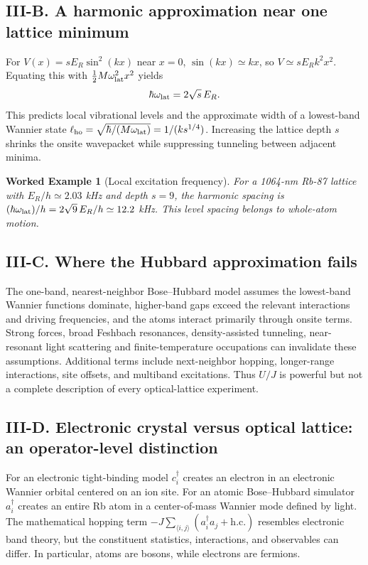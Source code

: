 \documentclass[11pt,a4paper]{article}
\newtheorem{example}{Worked Example}
\begin{document}
\subsection*{III-B. A harmonic approximation near one lattice minimum}
For $V(x)=sE_R\sin^2(kx)$ near $x=0$, $\sin(kx)\simeq kx$, so $V\simeq sE_R k^2x^2$. Equating this with $\tfrac12M\omega_{\rm lat}^2x^2$ yields
\begin{equation}\hbar\omega_{\rm lat}=2\sqrt{s}\,E_R.\end{equation}
This predicts local vibrational levels and the approximate width of a lowest-band Wannier state $\ell_{\rm ho}=\sqrt{\hbar/(M\omega_{\rm lat})}=1/(k s^{1/4})$. Increasing the lattice depth $s$ shrinks the onsite wavepacket while suppressing tunneling between adjacent minima.
\begin{example}[Local excitation frequency]
For a 1064-nm Rb-87 lattice with $E_R/h\simeq2.03$ kHz and depth $s=9$, the harmonic spacing is $(\hbar\omega_{\rm lat})/h=2\sqrt9\,E_R/h\simeq12.2$ kHz. This level spacing belongs to whole-atom motion.
\end{example}
\subsection*{III-C. Where the Hubbard approximation fails}
The one-band, nearest-neighbor Bose--Hubbard model assumes the lowest-band Wannier functions dominate, higher-band gaps exceed the relevant interactions and driving frequencies, and the atoms interact primarily through onsite terms. Strong forces, broad Feshbach resonances, density-assisted tunneling, near-resonant light scattering and finite-temperature occupations can invalidate these assumptions. Additional terms include next-neighbor hopping, longer-range interactions, site offsets, and multiband excitations. Thus $U/J$ is powerful but not a complete description of every optical-lattice experiment.
\subsection*{III-D. Electronic crystal versus optical lattice: an operator-level distinction}
For an electronic tight-binding model $c_i^\dagger$ creates an electron in an electronic Wannier orbital centered on an ion site. For an atomic Bose--Hubbard simulator $a_i^\dagger$ creates an entire Rb atom in a center-of-mass Wannier mode defined by light. The mathematical hopping term $-J\sum_{\langle i,j\rangle}(a_i^\dagger a_j+\mathrm{h.c.})$ resembles electronic band theory, but the constituent statistics, interactions, and observables can differ. In particular, atoms are bosons, while electrons are fermions.
\end{document}
